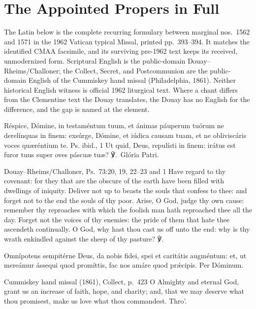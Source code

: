 \section*{The Appointed Propers in Full}

\noindent The Latin below is the complete recurring formulary between marginal
nos.~1562 and 1571 in the 1962 Vatican typical Missal, printed pp.~393--394.
It matches the identified CMAA facsimile, and its surviving pre-1962 text
keeps its received, unmodernized form. Scriptural
English is the public-domain Douay--Rheims/Challoner; the Collect, Secret, and
Postcommunion are the public-domain English of the Cummiskey hand missal
(Philadelphia, 1861). Neither historical English witness is official 1962
liturgical text. Where a chant differs from the Clementine text the Douay
translates, the Douay has no English for the difference, and the gap is named
at the element.

Réspice, Dómine, in testaméntum tuum, et ánimas páuperum tuórum ne
derelínquas in finem: exsúrge, Dómine, et iúdica causam tuam, et ne
obliviscáris voces quæréntium te. \textnormal{Ps. ibid., 1} Ut quid, Deus,
repulísti in finem: irátus est furor tuus super oves páscuæ tuæ?
℣.~Glória Patri.
\finishfulltextelement
\begin{fulltextenglish}{Douay--Rheims/Challoner, Ps.~73:20, 19, 22--23 and 1}
Have regard to thy covenant: for they that are the obscure of the earth have
been filled with dwellings of iniquity. Deliver not up to beasts the souls
that confess to thee: and forget not to the end the souls of thy poor. Arise,
O God, judge thy own cause: remember thy reproaches with which the foolish man
hath reproached thee all the day. Forget not the voices of thy enemies: the
pride of them that hate thee ascendeth continually. O God, why hast thou cast
us off unto the end: why is thy wrath enkindled against the sheep of thy
pasture? ℣.~
\end{fulltextenglish}

Omnípotens sempitérne Deus, da nobis fidei, spei et caritátis augméntum: et,
ut mereámur ássequi quod promíttis, fac nos amáre quod prǽcipis. Per Dóminum.
\finishfulltextelement
\begin{fulltextenglish}{Cummiskey hand missal (1861), Collect, p.~423}
O Almighty and eternal God, grant us an increase of faith, hope, and charity;
and, that we may deserve what thou promisest, make us love what thou
commandest. Thro'.
\end{fulltextenglish}

